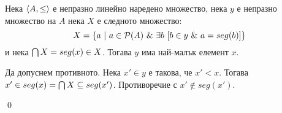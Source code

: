 \begin{tcolorbox}[mybox={Лема 3}, colback=purple!20, colframe=purple!40]

\quad
Нека $\langle A, \leq \rangle$ е непразно линейно наредено множество, нека $y$ е непразно множество на $A$
нека $X$ е следното множество:
\[
X = \{ a\ |\ a \in \mathcal{P}(A) \ \&\  \exists b\ [ b \in y \ \&\   a = seg(b)] \}
\]
\quad
и нека $\bigcap X = seg(x) \in X$. Тогава $y$ има най-малък елемент $x$.
\end{tcolorbox}

\begin{tcolorbox}[mybox={Доказателство:}]
\quad
Да допуснем противното.
Нека $x' \in y$ е такова, че $x' < x$.
Тогава $x' \in seg(x) = \bigcap X \subseteq seg(x')$.
Противоречие с $x' \notin seg(x')$.

\qed
\end{tcolorbox}
